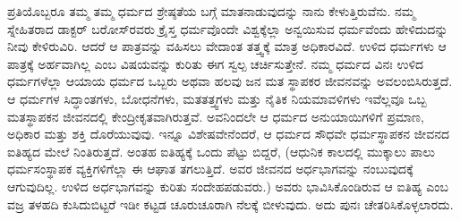 ಪ್ರತಿಯೊಬ್ಬರೂ ತಮ್ಮ ತಮ್ಮ ಧರ್ಮದ ಶ್ರೇಷ್ಠತೆಯ ಬಗ್ಗೆ ಮಾತನಾಡುವುದನ್ನು ನಾನು ಕೇಳುತ್ತಿರುವೆನು. ನಮ್ಮ ಸ್ನೇಹಿತರಾದ ಡಾಕ್ಟರ್​ ಬರೋಸ್​ರವರು ಕ್ರೈಸ್ತ ಧರ್ಮವೊಂದೇ ವಿಶ್ವಕ್ಕೆಲ್ಲಾ ಅನ್ವಯಿಸುವ ಧರ್ಮವೆಂದು ಹೇಳಿದುದನ್ನು ನೀವು ಕೇಳಿರುವಿರಿ. ಆದರೆ ಆ ಪಾತ್ರವನ್ನು ವಹಿಸಲು ವೇದಾಂತ ತತ್ತ್ವಕ್ಕೆ ಮಾತ್ರ ಅಧಿಕಾರವಿದೆ. ಉಳಿದ ಧರ್ಮಗಳು ಆ ಪಾತ್ರಕ್ಕೆ ಅರ್ಹವಾಗಿಲ್ಲ ಎಂಬ ವಿಷಯವನ್ನು ಕುರಿತು ಈಗ ಸ್ವಲ್ಪ ಚರ್ಚಿಸುತ್ತೇನೆ. ನಮ್ಮ ಧರ್ಮದ ವಿನಃ ಉಳಿದ ಧರ್ಮಗಳೆಲ್ಲಾ ಆಯಾಯ ಧರ್ಮದ ಒಬ್ಬರು ಅಥವಾ ಹಲವು ಜನ ಮತ ಸ್ಥಾಪಕರ ಜೀವನವನ್ನು ಅವಲಂಬಿಸಿರುತ್ತದೆ. ಆ ಧರ್ಮಗಳ ಸಿದ್ಧಾಂತಗಳು, ಬೋಧನೆಗಳು, ಮತತತ್ತ್ವಗಳು ಮತ್ತು ನೈತಿಕ ನಿಯಮಾವಳಿಗಳು ಇವೆಲ್ಲವೂ ಒಬ್ಬ ಮತಸ್ಥಾಪಕನ ಜೀವನದಲ್ಲಿ ಕೇಂದ್ರೀಕೃತವಾಗಿರುತ್ತವೆ. ಅವನಿಂದಲೇ ಆ ಧರ್ಮದ ಅನುಯಾಯಿಗಳಿಗೆ ಪ್ರಮಾಣ, ಅಧಿಕಾರ ಮತ್ತು ಶಕ್ತಿ ದೊರೆಯುವುವು. ಇನ್ನೂ ವಿಶೇಷವೇನೆಂದರೆ, ಆ ಧರ್ಮದ ಸೌಧವೇ ಧರ್ಮಸ್ಥಾಪಕನ ಜೀವನದ ಐತಿಹ್ಯದ ಮೇಲೆ ನಿಂತಿರುತ್ತದೆ. ಅಂತಹ ಐತಿಹ್ಯಕ್ಕೆ ಒಂದು ಪೆಟ್ಟು ಬಿದ್ದರೆ, (ಆಧುನಿಕ ಕಾಲದಲ್ಲಿ ಮುಕ್ಕಾಲು ಪಾಲು ಧರ್ಮಸಂಸ್ಥಾಪಕ ವ್ಯಕ್ತಿಗಳಿಗೆಲ್ಲಾ ಈ ಆಘಾತ ತಗಲುತ್ತಿದೆ. ಅವರ ಜೀವನದ ಅರ್ಧಭಾಗವನ್ನು ನಂಬುವುದಕ್ಕೆ ಆಗುವುದಿಲ್ಲ. ಉಳಿದ ಅರ್ಧಭಾಗವನ್ನು ಕುರಿತು ಸಂದೇಹಪಡುವರು.) ಅವರು ಭಾವಿಸಿಕೊಂಡಿರುವ ಆ ಐತಿಹ್ಯ ಎಂಬ ವಜ್ರ ತಳಹದಿ ಕುಸಿದುಬಿಟ್ಟರೆ ಇಡೀ ಕಟ್ಟಡ ಚೂರುಚೂರಾಗಿ ನೆಲಕ್ಕೆ ಬೀಳುವುದು. ಅದು ಪುನಃ ಚೇತರಿಸಿಕೊಳ್ಳಲಾರದು.

\vskip 0.3cm

